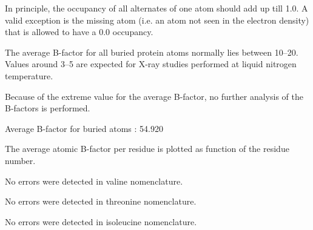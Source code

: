 \begin{note}
In principle, the occupancy of all alternates of one atom should add up till
1.0. A valid exception is the missing atom (i.e. an atom not seen in the
electron density) that is allowed to have a 0.0 occupancy.
\end{note}

\begin{warning}
The average B-factor for all buried protein atoms normally lies between
10--20. Values around 3--5 are expected for X-ray studies performed
at liquid nitrogen temperature.

Because of the extreme value for the average B-factor, no further analysis
of the B-factors is performed.

\parbox{1\textwidth}{
Average B-factor for buried atoms : 54.920
}%

\end{warning}

\begin{note}
The average atomic B-factor per residue is plotted as function of
the residue number.

\parbox{1\textwidth}{
}%


\parbox{1\textwidth}{
}%

\end{note}

\begin{note}


\parbox{1\textwidth}{
}%


\parbox{1\textwidth}{
}%

\end{note}

\begin{note}
No errors were detected in valine nomenclature.
\end{note}

\begin{note}
No errors were detected in threonine nomenclature.
\end{note}

\begin{note}
No errors were detected in isoleucine nomenclature.
\end{note}

